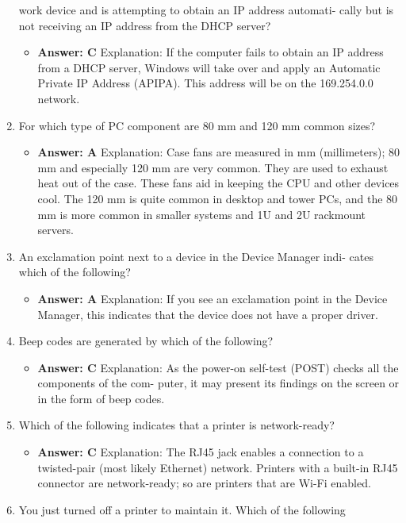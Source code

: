 \documentclass{article}
\begin{document}
\begin{enumerate}
work device and is attempting to obtain an IP address automati-
cally but is not receiving an IP address from the DHCP server?
    \begin{itemize}
        \item \textbf{Answer: C} Explanation: If the computer fails to obtain an IP address from a DHCP server,
Windows will take over and apply an Automatic Private IP Address (APIPA). This
address will be on the 169.254.0.0 network.
    \end{itemize}
    \item For which type of PC component are 80 mm and 120 mm common
sizes?
    \begin{itemize}
        \item \textbf{Answer: A}
Explanation: Case fans are measured in mm (millimeters); 80 mm and especially 120
mm are very common. They are used to exhaust heat out of the case. These fans aid
in keeping the CPU and other devices cool. The 120 mm is quite common in desktop
and tower PCs, and the 80 mm is more common in smaller systems and 1U and 2U
rackmount servers.
    \end{itemize}
    \item An exclamation point next to a device in the Device Manager indi-
cates which of the following?
    \begin{itemize}
        \item \textbf{Answer: A}
Explanation: If you see an exclamation point in the Device Manager, this indicates that
the device does not have a proper driver.
    \end{itemize}
    \item Beep codes are generated by which of the following?
    \begin{itemize}
        \item \textbf{Answer: C}
Explanation: As the power-on self-test (POST) checks all the components of the com-
puter, it may present its findings on the screen or in the form of beep codes.
    \end{itemize}
    \item Which of the following indicates that a printer is network-ready?
    \begin{itemize}
        \item \textbf{Answer: C}
Explanation: The RJ45 jack enables a connection to a twisted-pair (most likely
Ethernet) network. Printers with a built-in RJ45 connector are network-ready; so are
printers that are Wi-Fi enabled.
    \end{itemize}
    \item You just turned off a printer to maintain it. Which of the following

\end{enumerate}
\end{document}
